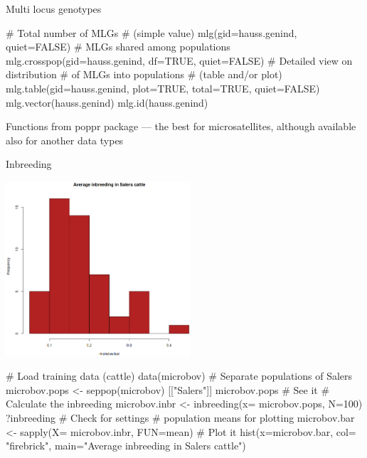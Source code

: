 \documentclass[compress, xelatex, 11pt, xcolor=svgnames, aspectratio=169,
	hyperref={
		bookmarks=true,
		unicode=true,
		colorlinks=true,
		pdftitle={Molecular data in R},
		plainpages=false,
		pdfauthor={Vojtech Zeisek},
		pdfsubject={Course about phylogeny and evolution in R},
		pdfcreator={XeLaTeX},
		pdfkeywords={R, evolution, phylogeny, molecular data},
		linkcolor=Crimson, %
		anchorcolor=Magenta, %
		citecolor=Magenta, %
		filecolor=Magenta, %
		menucolor=Magenta, %
		urlcolor=DodgerBlue, %
		},
	url={hyphens, lowtilde} %
	]{beamer}
\renewcommand{\texttt}[1]{\colorbox{Beige}{{\ttfamily #1}}}
\begin{document}
\begin{frame}[fragile]{Multi locus genotypes}
	\begin{multicols}{2}
		\texttt{[image: mlg.png]}
		\begin{spluscode}
    # Total number of MLGs
    # (simple value)
    mlg(gid=hauss.genind, quiet=FALSE)
    # MLGs shared among populations
    mlg.crosspop(gid=hauss.genind,
      df=TRUE, quiet=FALSE)
    # Detailed view on distribution
    # of MLGs into populations
    # (table and/or plot)
    mlg.table(gid=hauss.genind,
      plot=TRUE, total=TRUE,
      quiet=FALSE)
    mlg.vector(hauss.genind)
    mlg.id(hauss.genind)
		\end{spluscode}
	\end{multicols}
	Functions from poppr package --- the best for microsatellites, although available also for another data types
\end{frame}

\begin{frame}[fragile]{Inbreeding}
	\begin{multicols}{2}
		\includegraphics[height=6.5cm]{inbreeding.png}
		\begin{spluscode}
    # Load training data (cattle)
    data(microbov)
    # Separate populations of Salers
    microbov.pops <- seppop(microbov)
      [["Salers"]]
    microbov.pops # See it
    # Calculate the inbreeding
    microbov.inbr <- inbreeding(x=
      microbov.pops, N=100)
    ?inbreeding # Check for settings
    # population means for plotting
    microbov.bar <- sapply(X=
      microbov.inbr, FUN=mean)
    # Plot it
    hist(x=microbov.bar, col=
      "firebrick", main="Average
      inbreeding in Salers cattle")
		\end{spluscode}
	\end{multicols}
\end{frame}

\end{document}

